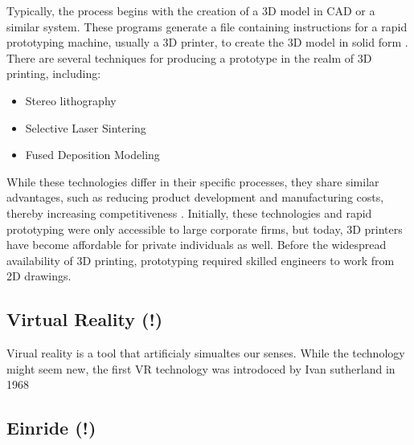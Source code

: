 Typically, the process begins with the creation of a 3D model in CAD or a similar system. 
These programs generate a file containing instructions for a rapid prototyping machine, usually 
a 3D printer, to create the 3D model in solid form \cite{sriharsha2018rapid}. There are several 
techniques for producing a prototype in the realm of 3D printing, including:
\begin{itemize}
    \item Stereo lithography
    \item Selective Laser Sintering
    \item Fused Deposition Modeling
\end{itemize}
While these technologies differ in their specific processes, they share similar advantages, such as 
reducing product development and manufacturing costs, thereby increasing competitiveness 
\cite{PHAM19981257}. Initially, these technologies and rapid prototyping were only accessible to 
large corporate firms, but today, 3D printers have become affordable for private individuals as well. 
Before the widespread availability of 3D printing, prototyping required skilled engineers to work from 
2D drawings.


\subsection{Virtual Reality (!)}
Virual reality  is a tool that artificialy simualtes our senses. While the technology might seem new, 
the first VR technology was introdoced by Ivan sutherland in 1968 
\subsection{Einride (!)}
